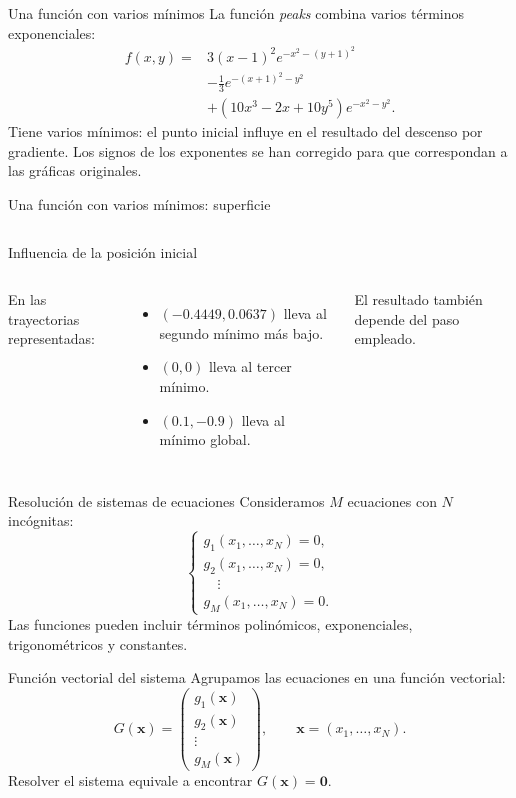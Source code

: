 \documentclass[original_version/main.tex]{subfiles}
\begin{document}
\begin{frame}[t]{Una función con varios mínimos}
\small
La función \textit{peaks} combina varios términos exponenciales:
\begin{align*}
f(x,y)={}&3(x-1)^2e^{-x^2-(y+1)^2}\\
&-\tfrac13e^{-(x+1)^2-y^2}\\
&+(10x^3-2x+10y^5)e^{-x^2-y^2}.
\end{align*}
Tiene varios mínimos: el punto inicial influye en el resultado del descenso por gradiente.
\medskip
\scriptsize Los signos de los exponentes se han corregido para que correspondan a las gráficas originales.
\end{frame}
\begin{frame}[t]{Una función con varios mínimos: superficie}
\begin{columns}\end{columns}
\end{frame}
\begin{frame}[t]{Influencia de la posición inicial}
\begin{columns}\small
En las trayectorias representadas:
\begin{itemize}
\item $(-0.4449,0.0637)$ lleva al segundo mínimo más bajo.
\item $(0,0)$ lleva al tercer mínimo.
\item $(0.1,-0.9)$ lleva al mínimo global.
\end{itemize}
El resultado también depende del paso empleado.
\end{columns}
\end{frame}
\begin{frame}[t]{Resolución de sistemas de ecuaciones}
Consideramos $M$ ecuaciones con $N$ incógnitas:
\[\begin{cases}
g_1(x_1,\ldots,x_N)=0,\\
g_2(x_1,\ldots,x_N)=0,\\
\quad\vdots\\
g_M(x_1,\ldots,x_N)=0.
\end{cases}\]
Las funciones pueden incluir términos polinómicos, exponenciales, trigonométricos y constantes.
\end{frame}
\begin{frame}[t]{Función vectorial del sistema}
Agrupamos las ecuaciones en una función vectorial:
\[G(\boldsymbol{x})=
\begin{pmatrix}g_1(\boldsymbol{x})\\g_2(\boldsymbol{x})\\\vdots\\g_M(\boldsymbol{x})\end{pmatrix},
\qquad \boldsymbol{x}=(x_1,\ldots,x_N).\]
Resolver el sistema equivale a encontrar $G(\boldsymbol{x})=\boldsymbol{0}$.
\end{frame}
\end{document}
